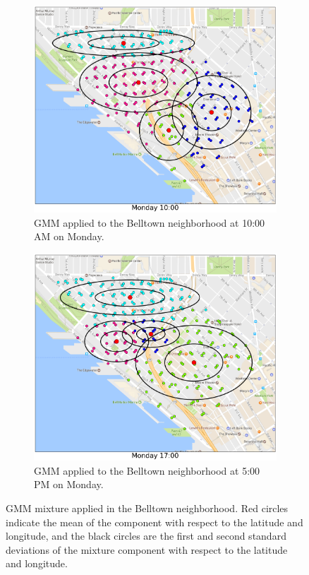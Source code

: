\documentclass{article}
\begin{document}
\begin{figure}[H]
\begin{subfigure}[t]{0.45\textwidth}
\centering
\includegraphics[width=.99\textwidth]{../figs/monday_10am_gmm.png}
\caption{GMM applied to the Belltown neighborhood at 10:00 AM on Monday.}
\label{fig:subim1}
\end{subfigure}\hfill
\begin{subfigure}[t]{0.45\textwidth}
\centering
\includegraphics[width=.99\textwidth]{../figs/monday_5pm_gmm.png}
\caption{GMM applied to the Belltown neighborhood at 5:00 PM on Monday.}
\label{fig:subim2}
\end{subfigure}
\caption{GMM mixture applied in the Belltown neighborhood. Red circles indicate the mean of the component with respect to the latitude and longitude, and the black circles are the first and second standard deviations of the mixture component with respect to the latitude and longitude.}
\label{fig:image2}
\end{figure}
\end{document}
